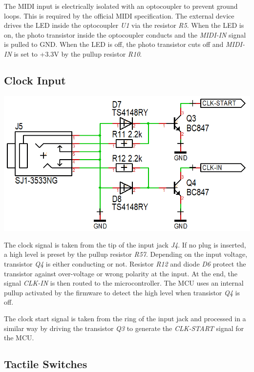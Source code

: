 \documentclass{scrartcl}
\begin{document}
The MIDI input is electrically isolated with an optocoupler to prevent ground loops. This is required by the official MIDI specification. The external device drives the LED inside the optocoupler \emph{U1} via the resistor \emph{R5}. When the LED is on, the photo transistor inside the optocoupler conducts and the \emph{MIDI-IN} signal is pulled to GND. When the LED is off, the photo transistor cuts off and \emph{MIDI-IN} is set to +3.3V by the pullup resistor \emph{R10}.

\subsection{Clock Input}

\begin{center}
    \includegraphics[scale=0.40]{assets/schema-clocks.png}
\end{center}

The clock signal is taken from the tip of the input jack \emph{J4}. If no plug is inserted, a high level is preset by the pullup resistor \emph{R57}. Depending on the input voltage, transistor \emph{Q4} is either conducting or not. Resistor \emph{R12} and diode \emph{D6} protect the transistor against over-voltage or wrong polarity at the input. At the end, the signal \emph{CLK-IN} is then routed to the microcontroller. The MCU uses an internal pullup activated by the firmware to detect the high level when transistor \emph{Q4} is off.

The clock start signal is taken from the ring of the input jack and processed in a similar way by driving the transistor \emph{Q3} to generate the \emph{CLK-START} signal for the MCU.

\subsection{Tactile Switches}
\end{document}
